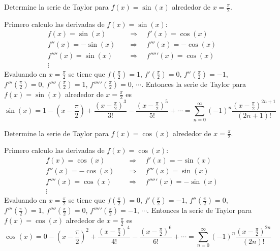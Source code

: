 \documentclass{article}
\begin{document}
\begin{example}{3}
    Determine la serie de Taylor para $f(x) = \sin(x)$ alrededor de $x=\frac{\pi}{2}$.
\end{example}
Primero calculo las derivadas de $f(x) = \sin(x)$:
\begin{align*}
    f(x) = \sin(x) \quad &\Rightarrow \quad f'(x) = \cos(x) \\
    f''(x) = -\sin(x) \quad &\Rightarrow \quad f'''(x) = -\cos(x) \\
    f''''(x) = \sin(x) \quad &\Rightarrow \quad f'''''(x) = \cos(x) \\
    \vdots
\end{align*}
Evaluando en $x=\frac{\pi}{2}$ se tiene que $f(\frac{\pi}{2}) = 1$, $f'(\frac{\pi}{2}) = 0$, $f''(\frac{\pi}{2}) = -1$, $f'''(\frac{\pi}{2}) = 0$, $f''''(\frac{\pi}{2}) = 1$, $f'''''(\frac{\pi}{2}) = 0$, $\cdots$. Entonces la serie de Taylor para $f(x) = \sin(x)$ alrededor de $x=\frac{\pi}{2}$ es
\begin{equation*}
    \sin(x) = 1 - (x-\frac{\pi}{2}) + \frac{(x-\frac{\pi}{2})^3}{3!} - \frac{(x-\frac{\pi}{2})^5}{5!} + \cdots = \sum_{n=0}^{\infty} (-1)^n \frac{(x-\frac{\pi}{2})^{2n+1}}{(2n+1)!}
\end{equation*}

\begin{example}{4}
    Determine la serie de Taylor para $f(x) = \cos(x)$ alrededor de $x=\frac{\pi}{2}$.
\end{example}
Primero calculo las derivadas de $f(x) = \cos(x)$:
\begin{align*}
    f(x) = \cos(x) \quad &\Rightarrow \quad f'(x) = -\sin(x) \\
    f''(x) = -\cos(x) \quad &\Rightarrow \quad f'''(x) = \sin(x) \\
    f''''(x) = \cos(x) \quad &\Rightarrow \quad f'''''(x) = -\sin(x) \\
    \vdots
\end{align*}
Evaluando en $x=\frac{\pi}{2}$ se tiene que $f(\frac{\pi}{2}) = 0$, $f'(\frac{\pi}{2}) = -1$, $f''(\frac{\pi}{2}) = 0$, $f'''(\frac{\pi}{2}) = 1$, $f''''(\frac{\pi}{2}) = 0$, $f'''''(\frac{\pi}{2}) = -1$, $\cdots$. Entonces la serie de Taylor para $f(x) = \cos(x)$ alrededor de $x=\frac{\pi}{2}$ es
\begin{equation*}
    \cos(x) = 0 - (x-\frac{\pi}{2})^2 + \frac{(x-\frac{\pi}{2})^4}{4!} - \frac{(x-\frac{\pi}{2})^6}{6!} + \cdots = \sum_{n=0}^{\infty} (-1)^n \frac{(x-\frac{\pi}{2})^{2n}}{(2n)!}
\end{equation*}
\end{document}
